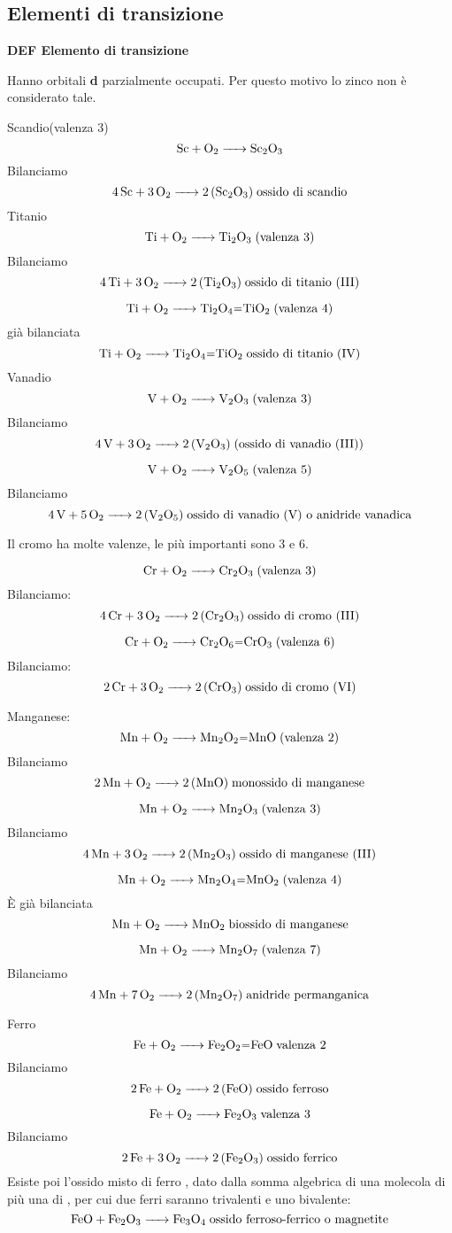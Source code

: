 \subsection{Elementi di transizione}
\textbf{DEF Elemento di transizione}

Hanno orbitali \textbf{d} parzialmente occupati. Per questo motivo lo zinco non è considerato tale.

Scandio(valenza 3)
$$\ce{ Sc + O_2 -> Sc_2O_3}$$
Bilanciamo
$$\ce{4 Sc + 3O_2 -> 2 (Sc_2O_3)} \; \text{ossido di scandio}$$
Titanio
$$\ce{ Ti + O_2 -> Ti_2O_3} \; \text{(valenza 3)}$$
Bilanciamo
$$\ce{4 Ti + 3 O_2 -> 2 (Ti_2O_3)} \; \text{ossido di titanio (III)}$$

$$\ce{ Ti + O_2 -> Ti_2O_4=TiO_2} \; \text{(valenza 4)}$$
\E già bilanciata
$$\ce{ Ti + O_2 -> Ti_2O_4=TiO_2} \; \text{ossido di titanio (IV)}$$
Vanadio
$$\ce{ V + O_2 -> V_2O_3} \; \text{(valenza 3)}$$
Bilanciamo
$$\ce{ 4 V + 3 O_2 -> 2 (V_2O_3)} \; \text{(ossido di vanadio (III))}$$

$$\ce{V + O_2 -> V_2O_5} \; \text{(valenza 5)}$$
Bilanciamo
$$\ce{ 4 V + 5 O_2 -> 2 (V_2O_5)} \;  \text{ossido di vanadio (V) o anidride vanadica}$$

Il cromo ha molte valenze, le più importanti sono 3 e 6.

$$\ce{ Cr + O_2 -> Cr_2O_3} \; \text{(valenza 3)}$$
Bilanciamo:
$$ \ce{ 4 Cr + 3 O_2 -> 2 (Cr_2O_3)}\; \text{ossido di cromo (III)}$$

$$\ce{ Cr + O_2 -> Cr_2O_6=CrO_3} \; \text{(valenza 6)}$$
Bilanciamo:
$$\ce{ 2 Cr + 3 O_2 -> 2 (CrO_3)}\; \text{ossido di cromo (VI)}$$

Manganese:
$$\ce{ Mn + O_2 -> Mn_2O_2=MnO} \; \text{(valenza 2)}$$
Bilanciamo
$$\ce{ 2 Mn + O_2 -> 2 (MnO)} \; \text{monossido di manganese}$$

$$\ce{ Mn + O_2 -> Mn_2O_3} \; \text{(valenza 3)}$$
Bilanciamo
$$\ce{ 4 Mn + 3O_2 -> 2 (Mn_2O_3)} \; \text{ossido di manganese (III)}$$

$$\ce{ Mn + O_2 -> Mn_2O_4=MnO_2} \; \text{(valenza 4)}$$
È già bilanciata
$$\ce{ Mn + O_2 -> MnO_2} \; \text{biossido di manganese}$$

$$\ce{ Mn + O_2 -> Mn_2O_7} \; \text{(valenza 7)}$$
Bilanciamo
$$\ce{ 4 Mn + 7O_2 -> 2 (Mn_2O_7)} \; \text{anidride permanganica}$$

Ferro 
$$\ce{ Fe + O_2 -> Fe_2O_2=FeO} \; \text{valenza 2}$$
Bilanciamo
$$\ce{ 2 Fe + O_2 -> 2 (FeO)} \; \text{ossido ferroso}$$

$$\ce{ Fe + O_2 -> Fe_2O_3} \; \text{valenza 3}$$
Bilanciamo
$$\ce{ 2 Fe + 3O_2 -> 2 (Fe_2O_3)} \; \text{ossido ferrico}$$
Esiste poi l'ossido misto di ferro , dato dalla somma algebrica di una molecola di  più una di , per cui due ferri saranno trivalenti e uno bivalente:
$$\ce{FeO + Fe_2O_3 -> Fe_3O_4} \; \text{ossido ferroso-ferrico o magnetite}$$

